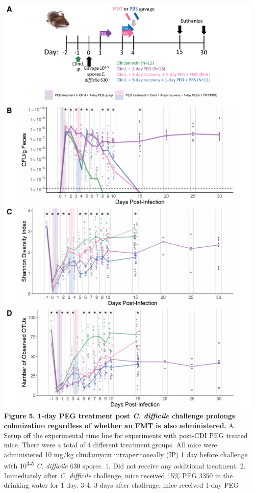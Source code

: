 \documentclass[
  11pt,
]{article}
\begin{document}
\includegraphics{figure_5.pdf} \textbf{Figure 5. 1-day PEG treatment
post \emph{C. difficile} challenge prolongs colonization regardless of
whether an FMT is also administered.} A. Setup off the experimental time
line for experiments with post-CDI PEG treated mice. There were a total
of 4 different treatment groups. All mice were administered 10 mg/kg
clindamycin intraperitoneally (IP) 1 day before challenge with
10\textsuperscript{3-5} \emph{C. difficile} 630 spores. 1. Did not
receive any additional treatment. 2. Immediately after \emph{C.
difficile} challenge, mice received 15\% PEG 3350 in the drinking water
for 1 day. 3-4. 3-days after challenge, mice received 1-day PEG
\end{document}
